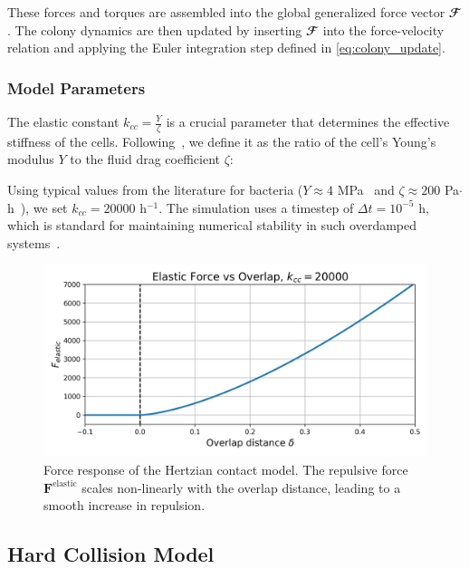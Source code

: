 \documentclass[conference]{IEEEtran}
\begin{document}
These forces and torques are assembled into the global generalized force vector $\mathbfcal{F}$. The colony dynamics are then updated by inserting $\mathbfcal{F}$ into the force-velocity relation and applying the Euler integration step defined in \autoref{eq:colony_update}.

\subsubsection{Model Parameters}

The elastic constant $k_{cc} = \frac{Y}{\zeta}$ is a crucial parameter that determines the effective stiffness of the cells. Following~\cite{You2018}, we define it as the ratio of the cell's Young's modulus $Y$ to the fluid drag coefficient $\zeta$:

Using typical values from the literature for bacteria ($Y \approx 4$ MPa~\cite{You2018, Blanchard2015} and $\zeta \approx 200$ Pa$\cdot$h~\cite{You2018}), we set $k_{cc} = 20000$ h$^{-1}$. The simulation uses a timestep of $\Delta t = 10^{-5}$ h, which is standard for maintaining numerical stability in such overdamped systems~\cite{Khan_2024, You2018, Blanchard2015}.

\begin{figure}[H]
    \centering
    \includegraphics[width=\linewidth]{figures/hertzian_contact_model.png}
    \caption{Force response of the Hertzian contact model. The repulsive force $\mathbf{F}^{\text{elastic}}$ scales non-linearly with the overlap distance, leading to a smooth increase in repulsion.}
    \label{fig:hertzian_contact_model}
\end{figure}

\subsection{Hard Collision Model}
\end{document}
